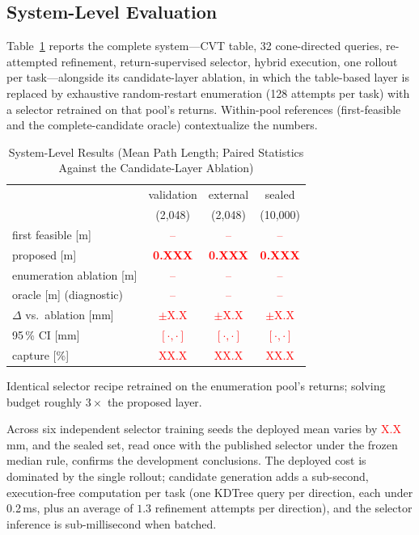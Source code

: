 \documentclass[journal]{IEEEtran}
\newcommand{\ph}[1]{\textcolor{red}{#1}}
\newcommand{\nDev}{2{,}048}
\newcommand{\nSealed}{10{,}000}
\newcommand{\phIkselVal}{\ph{0.XXX}}      %
\newcommand{\phIkselExt}{\ph{0.XXX}}      %
\newcommand{\phIkselSealed}{\ph{0.XXX}}   %
\newcommand{\phIvsEVal}{\ph{$\pm$X.X}}    %
\newcommand{\phIvsEExt}{\ph{$\pm$X.X}}
\newcommand{\phIvsESealed}{\ph{$\pm$X.X}}
\newcommand{\phCIVal}{\ph{$[\cdot,\cdot]$}}
\newcommand{\phCIExt}{\ph{$[\cdot,\cdot]$}}
\newcommand{\phCISealed}{\ph{$[\cdot,\cdot]$}}
\newcommand{\phCapVal}{\ph{XX.X}}
\newcommand{\phCapExt}{\ph{XX.X}}
\newcommand{\phCapSealed}{\ph{XX.X}}
\newcommand{\phSeedStd}{\ph{X.X}}
\begin{document}
\subsection{System-Level Evaluation}
\label{sec:system}
Table~\ref{tab:main} reports the complete system---CVT table, 32
cone-directed queries, re-attempted refinement, return-supervised
selector, hybrid execution, one rollout per task---alongside its
candidate-layer ablation, in which the table-based layer is replaced by
exhaustive random-restart enumeration (128 attempts per task) with a
selector retrained on that pool's returns. Within-pool references
(first-feasible and the complete-candidate oracle) contextualize the
numbers.

\begin{table}[!t]
\caption{System-Level Results (Mean Path Length; Paired Statistics
Against the Candidate-Layer Ablation)}
\label{tab:main}
\centering
\footnotesize
\begin{threeparttable}
\begin{tabular}{lccc}
\toprule
 & validation & external & sealed \\
 & (\nDev) & (\nDev) & (\nSealed) \\
\midrule
first feasible [m] & \ph{--} & \ph{--} & \ph{--} \\
proposed [m] & \textbf{\phIkselVal} & \textbf{\phIkselExt} &
\textbf{\phIkselSealed} \\
enumeration ablation [m]\tnote{1} & \ph{--} & \ph{--} & \ph{--} \\
oracle [m] (diagnostic) & \ph{--} & \ph{--} & \ph{--} \\
\midrule
$\Delta$ vs.\ ablation [mm] & \phIvsEVal & \phIvsEExt & \phIvsESealed \\
95\,\% CI [mm] & \phCIVal & \phCIExt & \phCISealed \\
capture [\%] & \phCapVal & \phCapExt & \phCapSealed \\
\bottomrule
\end{tabular}
\begin{tablenotes}
\item[1] Identical selector recipe retrained on the enumeration pool's
returns; solving budget roughly $3\times$ the proposed layer.
\end{tablenotes}
\end{threeparttable}
\end{table}

Across six independent selector training seeds the deployed mean varies
by \phSeedStd\,mm, and the sealed set, read once with the published
selector under the frozen median rule, confirms the development
conclusions. The deployed cost is dominated by the single rollout;
candidate generation adds a sub-second, execution-free computation per
task (one KDTree query per direction, each under 0.2\,ms, plus an
average of $1.3$ refinement attempts per direction), and the selector
inference is sub-millisecond when batched.
\end{document}
